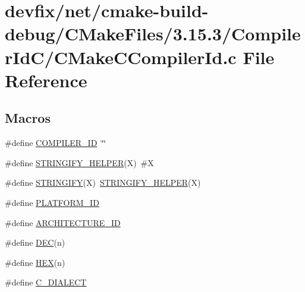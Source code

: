 \hypertarget{net_2cmake-build-debug_2CMakeFiles_23_815_83_2CompilerIdC_2CMakeCCompilerId_8c}{}\section{devfix/net/cmake-\/build-\/debug/\+C\+Make\+Files/3.15.3/\+Compiler\+Id\+C/\+C\+Make\+C\+Compiler\+Id.c File Reference}
\label{net_2cmake-build-debug_2CMakeFiles_23_815_83_2CompilerIdC_2CMakeCCompilerId_8c}
\subsection*{Macros}
\begin{DoxyCompactItemize}
\item 
\#define \hyperlink{net_2cmake-build-debug_2CMakeFiles_23_815_83_2CompilerIdC_2CMakeCCompilerId_8c_a81dee0709ded976b2e0319239f72d174}{C\+O\+M\+P\+I\+L\+E\+R\+\_\+\+ID}~\char`\"{}\char`\"{}
\item 
\#define \hyperlink{net_2cmake-build-debug_2CMakeFiles_23_815_83_2CompilerIdC_2CMakeCCompilerId_8c_a2ae9b72bb13abaabfcf2ee0ba7d3fa1d}{S\+T\+R\+I\+N\+G\+I\+F\+Y\+\_\+\+H\+E\+L\+P\+ER}(X)~\#X
\item 
\#define \hyperlink{net_2cmake-build-debug_2CMakeFiles_23_815_83_2CompilerIdC_2CMakeCCompilerId_8c_a43e1cad902b6477bec893cb6430bd6c8}{S\+T\+R\+I\+N\+G\+I\+FY}(X)~\hyperlink{net_2cmake-build-debug_2CMakeFiles_23_815_83_2CompilerIdCXX_2CMakeCXXCompilerId_8cpp_a2ae9b72bb13abaabfcf2ee0ba7d3fa1d}{S\+T\+R\+I\+N\+G\+I\+F\+Y\+\_\+\+H\+E\+L\+P\+ER}(X)
\item 
\#define \hyperlink{net_2cmake-build-debug_2CMakeFiles_23_815_83_2CompilerIdC_2CMakeCCompilerId_8c_adbc5372f40838899018fadbc89bd588b}{P\+L\+A\+T\+F\+O\+R\+M\+\_\+\+ID}
\item 
\#define \hyperlink{net_2cmake-build-debug_2CMakeFiles_23_815_83_2CompilerIdC_2CMakeCCompilerId_8c_aba35d0d200deaeb06aee95ca297acb28}{A\+R\+C\+H\+I\+T\+E\+C\+T\+U\+R\+E\+\_\+\+ID}
\item 
\#define \hyperlink{net_2cmake-build-debug_2CMakeFiles_23_815_83_2CompilerIdC_2CMakeCCompilerId_8c_ad1280362da42492bbc11aa78cbf776ad}{D\+EC}(n)
\item 
\#define \hyperlink{net_2cmake-build-debug_2CMakeFiles_23_815_83_2CompilerIdC_2CMakeCCompilerId_8c_a46d5d95daa1bef867bd0179594310ed5}{H\+EX}(n)
\item 
\#define \hyperlink{net_2cmake-build-debug_2CMakeFiles_23_815_83_2CompilerIdC_2CMakeCCompilerId_8c_a07f8e5783674099cd7f5110e22a78cdb}{C\+\_\+\+D\+I\+A\+L\+E\+CT}
\end{DoxyCompactItemize}
